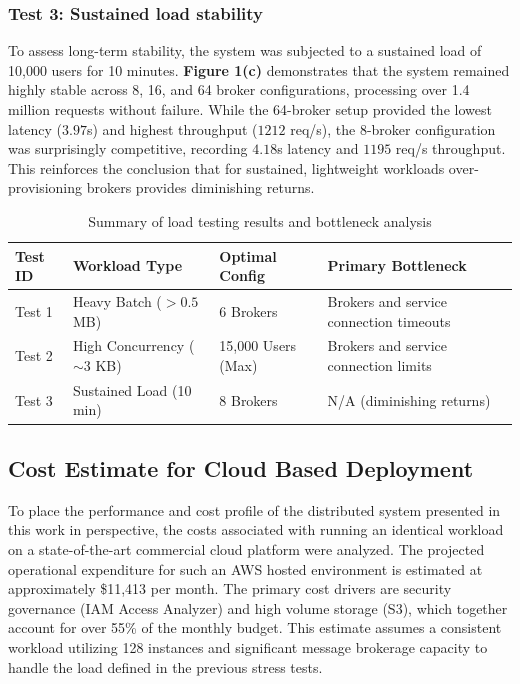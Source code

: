 \subsubsection{Test 3: Sustained load stability}
To assess long-term stability, the system was subjected to a sustained load of 10,000 users for 10 minutes. \textbf{Figure 1(c)} demonstrates that the system remained highly stable across 8, 16, and 64 broker configurations, processing over 1.4 million requests without failure. While the 64-broker setup provided the lowest latency ($3.97$s) and highest throughput ($1212$ req/s), the 8-broker configuration was surprisingly competitive, recording $4.18$s latency and $1195$ req/s throughput. This reinforces the conclusion that for sustained, lightweight workloads over-provisioning brokers provides diminishing returns.

\begin{table}[htbp]
    \centering
    \caption{Summary of load testing results and bottleneck analysis}
    \label{tab:load-test-summary}
    \begin{tabular}{@{}llll@{}}
        \toprule
        \textbf{Test ID} & \textbf{Workload Type} & \textbf{Optimal Config} & \textbf{Primary Bottleneck} \\ 
        \midrule
        Test 1 & Heavy Batch ($>0.5$ MB) & 6 Brokers & Brokers and service connection timeouts \\
        Test 2 & High Concurrency ($\sim3$ KB) & 15,000 Users (Max) & Brokers and service connection limits \\
        Test 3 & Sustained Load (10 min) & 8 Brokers & N/A (diminishing returns) \\
        \bottomrule
    \end{tabular}
\end{table}

\subsection{Cost Estimate for Cloud Based Deployment}


To place the performance and cost profile of the distributed system presented in this work in perspective, the costs associated with running an identical workload on a state-of-the-art commercial cloud platform were analyzed. The projected operational expenditure for such an AWS hosted environment is estimated at approximately \$11,413 per month. The primary cost drivers are security governance (IAM Access Analyzer) and high volume storage (S3), which together account for over 55\% of the monthly budget. This estimate assumes a consistent workload utilizing 128 instances and significant message brokerage capacity to handle the load defined in the previous stress tests.

